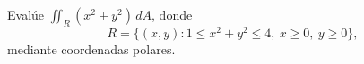Evalúe $\iint_R (x^2+y^2)\,dA$, donde
\[
R=\{(x,y):1\leq x^2+y^2\leq4,\ x\geq0,\ y\geq0\},
\]
mediante coordenadas polares.
